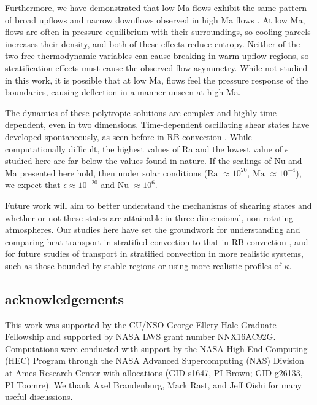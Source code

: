 \documentclass[aps, prl, twocolumn, nofootinbib, groupedaddress, amsfonts, amssymb, amsmath]{revtex4-1}
\begin{document}
Furthermore, we have demonstrated that low Ma flows exhibit the same pattern of broad upflows and narrow downflows
observed in high Ma flows \cite{hurlburt&all1984}.  At low Ma, flows are often in pressure equilibrium
with their surroundings, so cooling parcels increases their density, and both of these effects reduce
entropy.  Neither of the two free thermodynamic variables can cause breaking in warm upflow regions, 
so stratification effects must cause the observed flow asymmetry.
While not studied in this work, it is possible that at low Ma, flows feel the pressure response of the
boundaries, causing deflection in a manner unseen at high Ma.

The dynamics of these polytropic solutions are complex and highly time-dependent, even in two dimensions.
Time-dependent oscillating shear states have developed spontaneously, as seen before in RB convection
\cite{goluskin&all2014}.  While computationally difficult, the highest values of Ra and the lowest value
of $\epsilon$ studied here are far below the values found in nature.  If the scalings of Nu and Ma
presented here hold, then under solar conditions ($\text{Ra }\approx 10^{20}$, $\text{Ma }\approx 10^{-4}$), we expect that $\epsilon \approx 10^{-20}$ and
$\text{Nu }\approx 10^{6}$. 

Future work will aim to better understand the mechanisms of shearing states and
whether or not these states are attainable in three-dimensional, non-rotating atmospheres.  Our studies
here have set the groundwork for understanding and comparing heat transport in stratified convection
to that in RB convection \cite{johnston&doering2009}, and for future studies of transport in stratified
convection in more realistic systems, such as those bounded by stable regions \cite{hurlburt&all2009} or 
using more realistic profiles of $\kappa$.



\subsection{acknowledgements}
This work was supported by the CU/NSO George Ellery Hale Graduate Fellowship
and supported by NASA LWS grant number NNX16AC92G.  Computations were conducted 
with support by the NASA High End Computing (HEC) Program through the NASA 
Advanced Supercomputing (NAS) Division at Ames Research Center
with allocations (GID s1647, PI Brown; GID g26133, PI Toomre).
We thank Axel Brandenburg, Mark Rast, and Jeff Oishi for many useful discussions.


\end{document}
